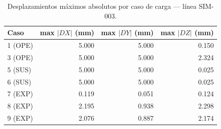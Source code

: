 \begin{table}[htbp]
  \centering
  \small
  \caption{Desplazamientos máximos absolutos por caso de carga — línea SIM-003.}
  \label{tab:desplaz-max}
  \begin{tabular}{lrrr}
    \toprule
    Caso & max $|DX|$ (\si{mm}) & max $|DY|$ (\si{mm}) & max $|DZ|$ (\si{mm}) \\
    \midrule
    1 (OPE) & 5.000 & 5.000 & 0.150 \\
    3 (OPE) & 5.000 & 5.000 & 2.324 \\
    5 (SUS) & 5.000 & 5.000 & 0.025 \\
    6 (SUS) & 5.000 & 5.000 & 0.025 \\
    7 (EXP) & 0.119 & 0.051 & 0.124 \\
    8 (EXP) & 2.195 & 0.938 & 2.298 \\
    9 (EXP) & 2.076 & 0.887 & 2.174 \\
    \bottomrule
  \end{tabular}
\end{table}
